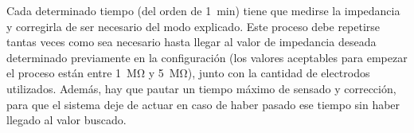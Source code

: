 Cada determinado tiempo (del orden de \SI{1}{\minute}) tiene que medirse la impedancia y corregirla de ser necesario del modo explicado. Este proceso debe repetirse tantas veces como sea necesario hasta llegar al valor de impedancia deseada determinado previamente en la configuración (los valores aceptables para empezar el proceso están entre \SI{1}{\mega\ohm} y \SI{5}{\mega\ohm}), junto con la cantidad de electrodos utilizados. Además, hay que pautar un tiempo máximo de sensado y corrección, para que el sistema deje de actuar en caso de haber pasado ese tiempo sin haber llegado al valor buscado.




